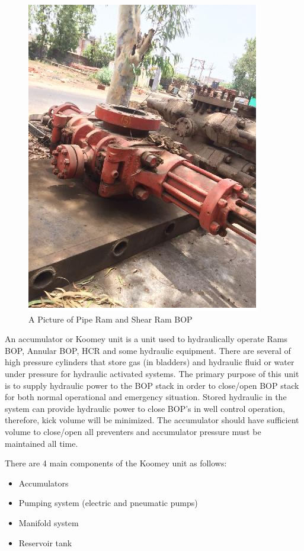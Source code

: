 \begin{figure}[h]
\includegraphics[scale=0.5]{images/shear_ram_BOP}
\centering 
\caption{A Picture of Pipe Ram and Shear Ram BOP}
\end{figure}

\vspace{2em}

An accumulator or Koomey unit is a unit used to hydraulically operate Rams BOP, Annular BOP, 
HCR and some hydraulic equipment. There are several of high pressure cylinders that store gas 
(in bladders) and hydraulic fluid or water under pressure for hydraulic activated systems. 
The primary purpose of this unit is to supply hydraulic power to the BOP stack in order to 
close/open BOP stack for both normal operational and emergency situation. Stored hydraulic in 
the system can provide hydraulic power to close BOP’s in well control operation, therefore, 
kick volume will be minimized. The accumulator should have sufficient volume to close/open 
all preventers and accumulator pressure must be maintained all time. 

\vspace{2em}


\noindent There are 4 main components of the Koomey unit as follows:

\begin{itemize}

\item Accumulators

\item Pumping system (electric and pneumatic pumps)

\item Manifold system

\item Reservoir tank

\end{itemize}






